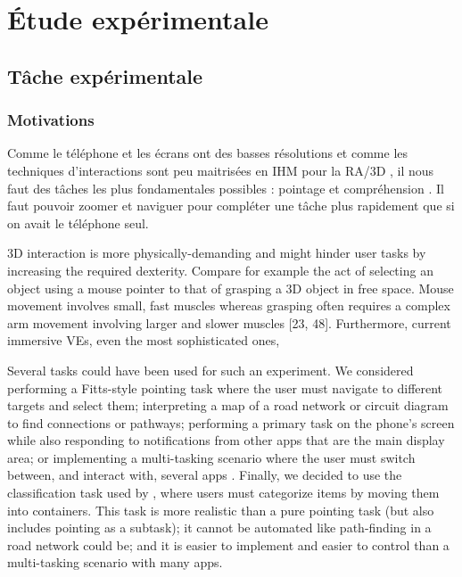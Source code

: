 \chapter{Étude expérimentale}
\label{ch:experiment}

\section{Tâche expérimentale}
\label{sec:experiment_task}

\subsection{Motivations}
\label{subsec:experiment_task_motivations}

Comme le téléphone et les écrans ont des basses résolutions et comme les techniques d'interactions sont peu maitrisées en IHM pour la RA/3D \citep{Piumsomboon2013}, il nous faut des tâches les plus fondamentales possibles : pointage \citep{Kitoe2018} et compréhension \cite{Berge2014}. Il faut pouvoir zoomer et naviguer pour compléter une tâche plus rapidement que si on avait le téléphone seul.

3D interaction is more physically-demanding and might hinder user tasks by increasing the required dexterity. Compare for example the act of selecting an object using a mouse pointer to that of grasping a 3D object in free space. Mouse movement involves small, fast muscles whereas grasping often requires a complex arm movement involving larger and slower muscles [23, 48]. Furthermore, current immersive VEs, even the most sophisticated ones, \cite{Argelaguet2013}

Several tasks could have been used for such an experiment. We considered performing a Fitts-style pointing task \citep{Soukoreff2004} where the user must navigate to different targets and select them; interpreting a map of a road network \citep{Baudisch2002} or circuit diagram to find connections or pathways; performing a primary task on the phone's screen while also responding to notifications from other apps that are  the main display area; or implementing a multi-tasking scenario where the user must switch between, and interact with, several apps \citep{Ens2014}. Finally, we decided to use the classification task used by \cite{Liu2014}, where users must categorize items by moving them into containers. This task is more realistic than a pure pointing task (but also includes pointing as a subtask); it cannot be automated like path-finding in a road network could be; and it is easier to implement and easier to control than a multi-tasking scenario with many apps.


